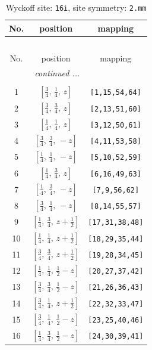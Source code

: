 \documentclass[fleqn,8pt]{jsarticle}
\begin{document}
\begin{longtable}{ccc}
\caption{Wyckoff site: {\tt 16i}, site symmetry: {\tt 2.mm}}
 \\
 \hline \hline
No. & position & mapping \\ \hline \endfirsthead

\multicolumn{2}{l}{\tablename\ \thetable{}} \\
 \hline \hline
No. & position & mapping \\ \hline \endhead

 \hline \hline
\multicolumn{2}{r}{\footnotesize\it continued ...} \\ \endfoot

 \hline \hline
\multicolumn{2}{r}{} \\ \endlastfoot

1 & $\left[ \frac{3}{4},\, \frac{1}{4},\, z \right]$ & {\tt [1,15,54,64]} \\ \hline
2 & $\left[ \frac{3}{4},\, \frac{3}{4},\, z \right]$ & {\tt [2,13,51,60]} \\ \hline
3 & $\left[ \frac{1}{4},\, \frac{1}{4},\, z \right]$ & {\tt [3,12,50,61]} \\ \hline
4 & $\left[ \frac{3}{4},\, \frac{3}{4},\, - z \right]$ & {\tt [4,11,53,58]} \\ \hline
5 & $\left[ \frac{1}{4},\, \frac{1}{4},\, - z \right]$ & {\tt [5,10,52,59]} \\ \hline
6 & $\left[ \frac{1}{4},\, \frac{3}{4},\, z \right]$ & {\tt [6,16,49,63]} \\ \hline
7 & $\left[ \frac{1}{4},\, \frac{3}{4},\, - z \right]$ & {\tt [7,9,56,62]} \\ \hline
8 & $\left[ \frac{3}{4},\, \frac{1}{4},\, - z \right]$ & {\tt [8,14,55,57]} \\ \hline
9 & $\left[ \frac{1}{4},\, \frac{3}{4},\, z + \frac{1}{2} \right]$ & {\tt [17,31,38,48]} \\ \hline
10 & $\left[ \frac{1}{4},\, \frac{1}{4},\, z + \frac{1}{2} \right]$ & {\tt [18,29,35,44]} \\ \hline
11 & $\left[ \frac{3}{4},\, \frac{3}{4},\, z + \frac{1}{2} \right]$ & {\tt [19,28,34,45]} \\ \hline
12 & $\left[ \frac{1}{4},\, \frac{1}{4},\, \frac{1}{2} - z \right]$ & {\tt [20,27,37,42]} \\ \hline
13 & $\left[ \frac{3}{4},\, \frac{3}{4},\, \frac{1}{2} - z \right]$ & {\tt [21,26,36,43]} \\ \hline
14 & $\left[ \frac{3}{4},\, \frac{1}{4},\, z + \frac{1}{2} \right]$ & {\tt [22,32,33,47]} \\ \hline
15 & $\left[ \frac{3}{4},\, \frac{1}{4},\, \frac{1}{2} - z \right]$ & {\tt [23,25,40,46]} \\ \hline
16 & $\left[ \frac{1}{4},\, \frac{3}{4},\, \frac{1}{2} - z \right]$ & {\tt [24,30,39,41]} \\
\end{longtable}
\end{document}
